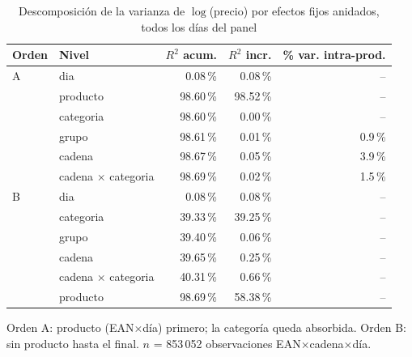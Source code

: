 \begin{table}[htbp]
\caption{Descomposici\'on de la varianza de $\log$(precio) por efectos fijos anidados, todos los d\'ias del panel}
\label{tab:varianza}
\centering\scriptsize\setlength{\tabcolsep}{3pt}
\begin{tabular}{@{}llrrr@{}}
\toprule
Orden & Nivel & $R^2$ acum. & $R^2$ incr. & \% var. intra-prod. \\
\midrule
A & dia & 0.08\,\% & 0.08\,\% & -- \\
 & producto & 98.60\,\% & 98.52\,\% & -- \\
 & categoria & 98.60\,\% & 0.00\,\% & -- \\
 & grupo & 98.61\,\% & 0.01\,\% & 0.9\,\% \\
 & cadena & 98.67\,\% & 0.05\,\% & 3.9\,\% \\
 & cadena $\times$ categoria & 98.69\,\% & 0.02\,\% & 1.5\,\% \\
\midrule
B & dia & 0.08\,\% & 0.08\,\% & -- \\
 & categoria & 39.33\,\% & 39.25\,\% & -- \\
 & grupo & 39.40\,\% & 0.06\,\% & -- \\
 & cadena & 39.65\,\% & 0.25\,\% & -- \\
 & cadena $\times$ categoria & 40.31\,\% & 0.66\,\% & -- \\
 & producto & 98.69\,\% & 58.38\,\% & -- \\
\bottomrule\end{tabular}
\par\smallskip\raggedright\scriptsize Orden A: producto (EAN$\times$d\'ia) primero; la categor\'ia queda absorbida. Orden B: sin producto hasta el final. $n$ = 853\,052 observaciones EAN$\times$cadena$\times$d\'ia.
\end{table}
